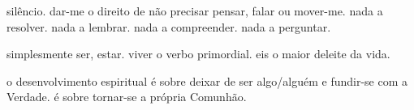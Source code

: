 silêncio. dar-me o direito de não precisar pensar, falar ou mover-me. nada a resolver. nada a lembrar. nada a compreender. nada a perguntar.

simplesmente ser, estar. viver o verbo primordial. eis o maior deleite da vida.

o desenvolvimento espiritual é sobre deixar de ser algo/alguém e fundir-se com a Verdade. é sobre tornar-se a própria Comunhão.
